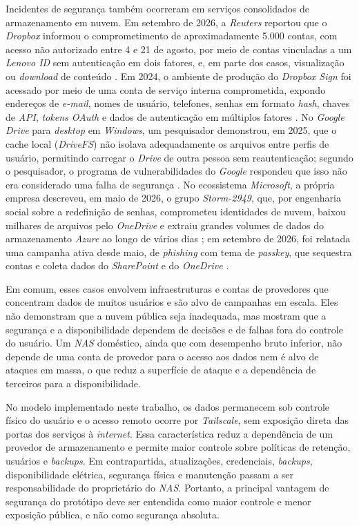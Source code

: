 Incidentes de segurança também ocorreram em serviços consolidados de armazenamento em nuvem. Em setembro de 2026, a \textit{Reuters} reportou que o \textit{Dropbox} informou o comprometimento de aproximadamente 5.000 contas, com acesso não autorizado entre 4 e 21 de agosto, por meio de contas vinculadas a um \textit{Lenovo ID} sem autenticação em dois fatores, e, em parte dos casos, visualização ou \textit{download} de conteúdo \cite{reuters2026}. Em 2024, o ambiente de produção do \textit{Dropbox Sign} foi acessado por meio de uma conta de serviço interna comprometida, expondo endereços de \textit{e-mail}, nomes de usuário, telefones, senhas em formato \textit{hash}, chaves de \textit{API}, \textit{tokens OAuth} e dados de autenticação em múltiplos fatores \cite{malwarebytes2024}. No \textit{Google Drive} para \textit{desktop} em \textit{Windows}, um pesquisador demonstrou, em 2025, que o cache local (\textit{DriveFS}) não isolava adequadamente os arquivos entre perfis de usuário, permitindo carregar o \textit{Drive} de outra pessoa sem reautenticação; segundo o pesquisador, o programa de vulnerabilidades do \textit{Google} respondeu que isso não era considerado uma falha de segurança \cite{cybersecuritynews2025}. No ecossistema \textit{Microsoft}, a própria empresa descreveu, em maio de 2026, o grupo \textit{Storm-2949}, que, por engenharia social sobre a redefinição de senhas, comprometeu identidades de nuvem, baixou milhares de arquivos pelo \textit{OneDrive} e extraiu grandes volumes de dados do armazenamento \textit{Azure} ao longo de vários dias \cite{microsoft2026}; em setembro de 2026, foi relatada uma campanha ativa desde maio, de \textit{phishing} com tema de \textit{passkey}, que sequestra contas e coleta dados do \textit{SharePoint} e do \textit{OneDrive} \cite{thehackernews2026}.

Em comum, esses casos envolvem infraestruturas e contas de provedores que concentram dados de muitos usuários e são alvo de campanhas em escala. Eles não demonstram que a nuvem pública seja inadequada, mas mostram que a segurança e a disponibilidade dependem de decisões e de falhas fora do controle do usuário. Um \textit{NAS} doméstico, ainda que com desempenho bruto inferior, não depende de uma conta de provedor para o acesso aos dados nem é alvo de ataques em massa, o que reduz a superfície de ataque e a dependência de terceiros para a disponibilidade.

No modelo implementado neste trabalho, os dados permanecem sob controle físico do usuário e o acesso remoto ocorre por \textit{Tailscale}, sem exposição direta das portas dos serviços à \textit{internet}. Essa característica reduz a dependência de um provedor de armazenamento e permite maior controle sobre políticas de retenção, usuários e \textit{backups}. Em contrapartida, atualizações, credenciais, \textit{backups}, disponibilidade elétrica, segurança física e manutenção passam a ser responsabilidade do proprietário do \textit{NAS}. Portanto, a principal vantagem de segurança do protótipo deve ser entendida como maior controle e menor exposição pública, e não como segurança absoluta.

